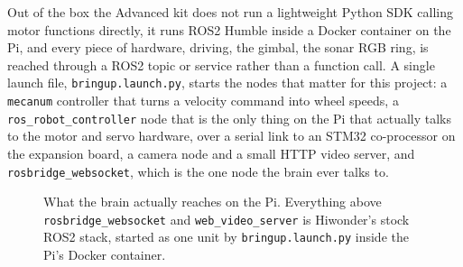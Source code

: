 Out of the box the Advanced kit does not run a lightweight Python SDK
calling motor functions directly, it runs ROS2 Humble inside a Docker
container on the Pi, and every piece of hardware, driving, the gimbal,
the sonar RGB ring, is reached through a ROS2 topic or service rather
than a function call. A single launch file, \texttt{bringup.launch.py},
starts the nodes that matter for this project: a \texttt{mecanum}
controller that turns a velocity command into wheel speeds, a
\texttt{ros\_robot\_controller} node that is the only thing on the Pi
that actually talks to the motor and servo hardware, over a serial link
to an STM32 co-processor on the expansion board, a camera node and a
small HTTP video server, and \texttt{rosbridge\_websocket}, which is the
one node the brain ever talks to.

\begin{figure}[htbp]
  \centering
  \caption{What the brain actually reaches on the Pi. Everything above
  \texttt{rosbridge\_websocket} and \texttt{web\_video\_server} is
  Hiwonder's stock ROS2 stack, started as one unit by
  \texttt{bringup.launch.py} inside the Pi's Docker container.}
  \label{fig:hw-bridge}
\end{figure}

\label{sec:hw_bridge}

